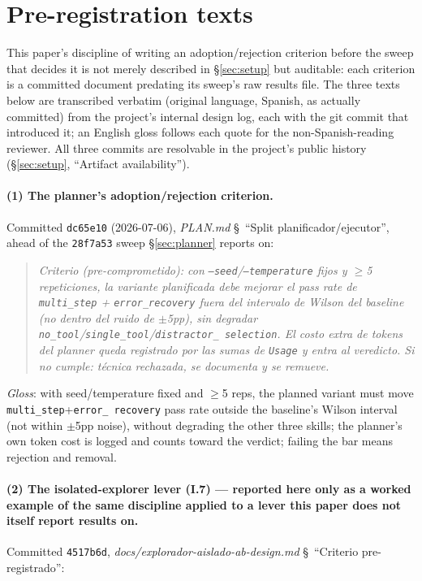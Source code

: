 \documentclass[smallcondensed,natbib]{svjour3}
\begin{document}
\section{Pre-registration texts}\label{app:prereg}

This paper's discipline of writing an adoption/rejection criterion
before the sweep that decides it is not merely described in
\S\ref{sec:setup} but auditable: each criterion is a committed document
predating its sweep's raw results file. The three texts below are
transcribed verbatim (original language, Spanish, as actually
committed) from the project's internal design log, each with the git
commit that introduced it; an English gloss follows each quote for the
non-Spanish-reading reviewer. All three commits are resolvable in the
project's public history (\S\ref{sec:setup}, ``Artifact availability'').

\paragraph{(1) The planner's adoption/rejection criterion.} Committed
\texttt{dc65e10} (2026-07-06), \emph{PLAN.md} \S~``Split
planificador/ejecutor'', ahead of the \texttt{28f7a53} sweep
\S\ref{sec:planner} reports on:

\begin{quote}\itshape\small
Criterio (pre-comprometido): con \texttt{--seed}/\texttt{--temperature}
fijos y $\geq$5 repeticiones, la variante planificada debe mejorar el
pass rate de \texttt{multi\_step} + \texttt{error\_recovery} fuera del
intervalo de Wilson del baseline (no dentro del ruido de $\pm$5pp), sin
degradar \texttt{no\_tool}/\texttt{single\_tool}/\texttt{distractor\_%
selection}. El costo extra de tokens del planner queda registrado por
las sumas de \texttt{Usage} y entra al veredicto. Si no cumple: t\'ecnica
rechazada, se documenta y se remueve.
\end{quote}

\noindent\emph{Gloss}: with seed/temperature fixed and $\geq$5 reps,
the planned variant must move \texttt{multi\_step}+\texttt{error\_%
recovery} pass rate outside the baseline's Wilson interval (not within
$\pm$5pp noise), without degrading the other three skills; the
planner's own token cost is logged and counts toward the verdict;
failing the bar means rejection and removal.

\paragraph{(2) The isolated-explorer lever (I.7) --- reported here only
as a worked example of the same discipline applied to a lever this
paper does not itself report results on.} Committed \texttt{4517b6d},
\emph{docs/explorador-aislado-ab-design.md} \S~``Criterio
pre-registrado'':
\end{document}
